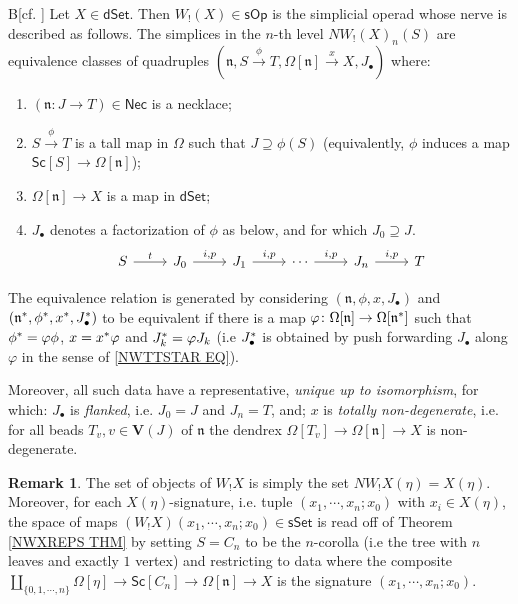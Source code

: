 \documentclass[a4paper,10pt
,draft
]{article}%
\numberwithin{equation}{section}
\numberwithin{figure}{section}
\theoremstyle{definition} %
\newtheorem{remark}[equation]{Remark}%
\newcommand{\sOp}{\ensuremath{\mathsf{sOp}}}%
\newcommand{\1}{\ensuremath{\mathbbm 1}}%
\begin{document}
\begin{customthm}{B}[{cf. \cite[Cor. 4.4]{DS11}}]
	\label{NWXREPS THM}
	Let $X\in \mathsf{dSet}$.
%
	Then $W_!(X) \in \sOp$ is the simplicial operad whose 
	nerve is described as follows.
%	
	The simplices in the $n$-th level
	$NW_!(X)_{n}(S)$
	are equivalence classes of quadruples
	$(\mathfrak{n}, S \xrightarrow{\phi} T, \Omega[\mathfrak{n}] \xrightarrow{x} X, J_{\bullet})$ 
	where:
\begin{enumerate}[label=(\roman*)]
	\item $(\mathfrak{n}\colon J \to T) \in \mathsf{Nec}$ is a necklace; 
	\item $S \xrightarrow{\phi} T$
		is a tall map in $\Omega$
		such that $J \supseteq \phi(S)$
		(equivalently, $\phi$ induces a map
		$\mathsf{Sc}[S] \to \Omega[\mathfrak{n}]$);		
	\item $\Omega[ \mathfrak{n}] \to X$ is a map in $\mathsf{dSet}$;
	\item $J_{\bullet}$ denotes a 
		factorization of $\phi$ as below,
		and for which $J_0 \supseteq J$.
\begin{equation}\label{STRINCOR EQ}
\begin{tikzcd}
	S \ar{r}{t}
&
	J_0 \ar{r}{i,p}
&
	J_1 \ar{r}{i,p}
	&
\cdots
	\ar{r}{i,p}
&
	J_n \ar{r}{i,p}
&
	T
\end{tikzcd}
\end{equation}
\end{enumerate}
	The equivalence relation is generated by considering 
	$(\mathfrak{n},\phi,x,J_{\bullet})$ and
	$(\mathfrak{n}^{\**},\phi^{\**},x^{\**},J_{\bullet}^{\**})$
	to be equivalent if there is
	a map
	$\varphi \colon \Omega[\mathfrak{n}] \to \Omega[\mathfrak{n}^{\**}]$
	such that
	$\phi^{\**} = \varphi \phi$,
	$x = x^{\**} \varphi $
	and
	$J^{\**}_k = \varphi J_k$
	(i.e $J^{\**}_{\bullet}$
	is obtained by push forwarding 
	$J_{\bullet}$ along $\varphi$
	in the sense of \eqref{NWTTSTAR EQ}).
	
	Moreover, all such data have a representative, 
	\emph{unique up to isomorphism},
	for which:
	$J_{\bullet}$ is \emph{flanked},
	i.e. $J_0=J$ and $J_n=T$,
	and;
	$x$ is \emph{totally non-degenerate},
	i.e. for all beads 
	$T_v, v \in \boldsymbol{V}(J)$ of 
	$\mathfrak{n}$
	the dendrex
	$\Omega[T_v] \to \Omega[\mathfrak{n}] \to X$
	is non-degenerate. 
\end{customthm}



\begin{remark}
	The set of objects of $W_! X$ is simply the set
	$NW_! X(\eta) = X(\eta)$.
	Moreover, for each $X(\eta)$-signature, 
	i.e. tuple $(x_1,\cdots,x_n;x_0)$ with $x_i \in X(\eta)$,
	the space of maps
	$(W_! X)(x_1,\cdots,x_n;x_0) \in \mathsf{sSet}$
	is read off of Theorem \ref{NWXREPS THM}
	by setting $S=C_n$ to be the $n$-corolla
	(i.e the tree with $n$ leaves and exactly $1$ vertex)
	and restricting to data where the composite
	$\coprod_{\{0,1,\cdots,n\}}\Omega[\eta] 
	\to \mathsf{Sc}[C_n] \to 
	\Omega[\mathfrak{n}] \to X$
	is the signature $(x_1,\cdots,x_n;x_0)$.
\end{remark}
\end{document}
